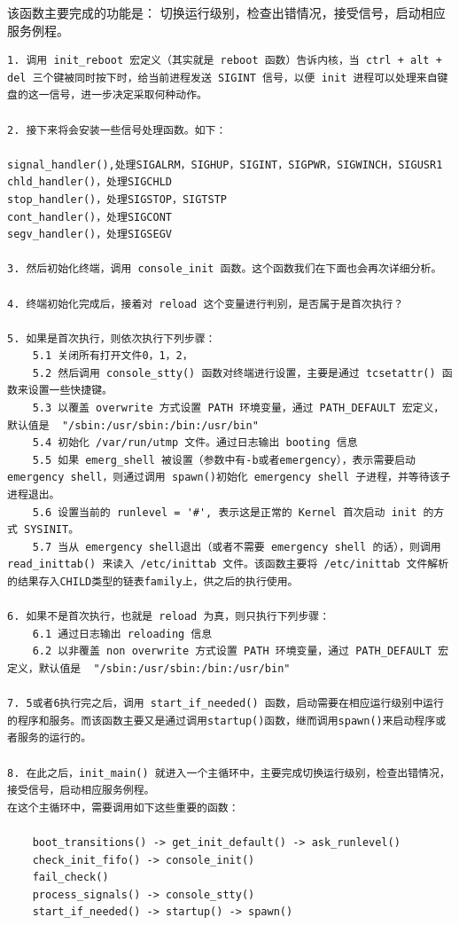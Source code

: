该函数主要完成的功能是：
切换运行级别，检查出错情况，接受信号，启动相应服务例程。

{\begin{shaded}\begin{verbatim}
1. 调用 init_reboot 宏定义（其实就是 reboot 函数）告诉内核，当 ctrl + alt + del 三个键被同时按下时，给当前进程发送 SIGINT 信号，以便 init 进程可以处理来自键盘的这一信号，进一步决定采取何种动作。

2. 接下来将会安装一些信号处理函数。如下：

signal_handler(),处理SIGALRM，SIGHUP，SIGINT，SIGPWR，SIGWINCH，SIGUSR1
chld_handler()，处理SIGCHLD
stop_handler()，处理SIGSTOP，SIGTSTP
cont_handler()，处理SIGCONT
segv_handler()，处理SIGSEGV

3. 然后初始化终端，调用 console_init 函数。这个函数我们在下面也会再次详细分析。

4. 终端初始化完成后，接着对 reload 这个变量进行判别，是否属于是首次执行？ 

5. 如果是首次执行，则依次执行下列步骤：
    5.1 关闭所有打开文件0，1，2，
    5.2 然后调用 console_stty() 函数对终端进行设置，主要是通过 tcsetattr() 函数来设置一些快捷键。
    5.3 以覆盖 overwrite 方式设置 PATH 环境变量，通过 PATH_DEFAULT 宏定义，默认值是  "/sbin:/usr/sbin:/bin:/usr/bin"
    5.4 初始化 /var/run/utmp 文件。通过日志输出 booting 信息
    5.5 如果 emerg_shell 被设置（参数中有-b或者emergency），表示需要启动 emergency shell，则通过调用 spawn()初始化 emergency shell 子进程，并等待该子进程退出。
    5.6 设置当前的 runlevel = '#', 表示这是正常的 Kernel 首次启动 init 的方式 SYSINIT。
    5.7 当从 emergency shell退出（或者不需要 emergency shell 的话），则调用 read_inittab() 来读入 /etc/inittab 文件。该函数主要将 /etc/inittab 文件解析的结果存入CHILD类型的链表family上，供之后的执行使用。

6. 如果不是首次执行，也就是 reload 为真，则只执行下列步骤：
    6.1 通过日志输出 reloading 信息
    6.2 以非覆盖 non overwrite 方式设置 PATH 环境变量，通过 PATH_DEFAULT 宏定义，默认值是  "/sbin:/usr/sbin:/bin:/usr/bin"

7. 5或者6执行完之后，调用 start_if_needed() 函数，启动需要在相应运行级别中运行的程序和服务。而该函数主要又是通过调用startup()函数，继而调用spawn()来启动程序或者服务的运行的。

8. 在此之后，init_main() 就进入一个主循环中，主要完成切换运行级别，检查出错情况，接受信号，启动相应服务例程。
在这个主循环中，需要调用如下这些重要的函数：

    boot_transitions() -> get_init_default() -> ask_runlevel()
    check_init_fifo() -> console_init()
    fail_check()
    process_signals() -> console_stty()
    start_if_needed() -> startup() -> spawn()
\end{verbatim}\end{shaded}}
